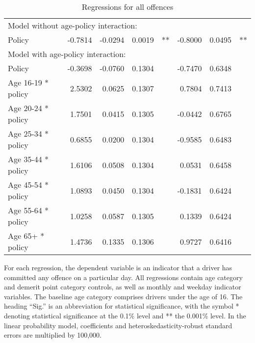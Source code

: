 \begin{table}
\begin{tabular}{l r r r l r r l}
\hline
\multicolumn{7}{l}{Model without age-policy interaction: } \\ 
Policy                   &  -0.7814       &  -0.0294        &  0.0019       &   **       &  -0.8000        &  0.0495       &   **       \\ 
\hline
\multicolumn{7}{l}{Model with age-policy interaction: } \\ 
Policy                   &  -0.3698       &  -0.0760        &  0.1304       &            &  -0.7470        &  0.6348       &            \\ 
Age 16-19 * policy   &  2.5302       &  0.0625        &  0.1307       &            &  0.7804        &  0.7413       &            \\ 
Age 20-24 * policy   &  1.7501       &  0.0415        &  0.1305       &            &  -0.0442        &  0.6765       &            \\ 
Age 25-34 * policy   &  0.6855       &  0.0200        &  0.1304       &            &  -0.9585        &  0.6483       &            \\ 
Age 35-44 * policy   &  1.6106       &  0.0508        &  0.1304       &            &  0.0531        &  0.6458       &            \\ 
Age 45-54 * policy   &  1.0893       &  0.0450        &  0.1304       &            &  -0.1831        &  0.6424       &            \\ 
Age 55-64 * policy   &  1.0258       &  0.0587        &  0.1305       &            &  0.1339        &  0.6424       &            \\ 
Age 65+ * policy   &  1.4736       &  0.1335        &  0.1306       &            &  0.9727        &  0.6416       &            \\ 

\hline 

\end{tabular} 
\caption{Regressions for all offences} 
For each regression, the dependent variable is an indicator that a driver has committed  
any offence on a particular day.  
All regressions contain age category and demerit point category controls, 
as well as monthly and weekday indicator variables. 
The baseline age category comprises drivers under the age of 16. 
The heading ``Sig.'' is an abbreviation for statistical significance, with 
the symbol * denoting statistical significance at the 0.1\% level 
and ** the 0.001\% level. 
In the linear probability model, coefficients and heteroskedasticity-robust standard errors are  
multiplied by 100,000.  
\label{tab:seas_Logit_vs_LPMx100K_pooled_regs} 
\end{table} 
 
